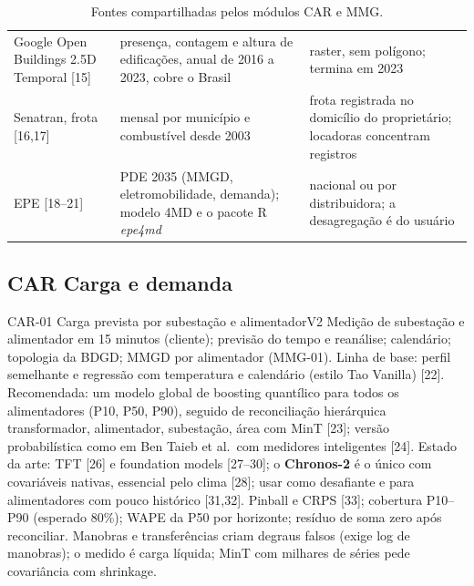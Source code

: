 \begin{table}[H]
\begin{tabularx}{\textwidth}{P{3.2cm} L P{4.2cm}}
Google Open Buildings 2.5D Temporal [15] & presença, contagem e altura de edificações, anual de 2016 a 2023, cobre o Brasil & raster, sem polígono; termina em 2023 \\
Senatran, frota [16,17] & mensal por município e combustível desde 2003 & frota registrada no domicílio do proprietário; locadoras concentram registros \\
EPE [18--21] & PDE 2035 (MMGD, eletromobilidade, demanda); modelo 4MD e o pacote R \emph{epe4md} & nacional ou por distribuidora; a desagregação é do usuário \\
\bottomrule
\end{tabularx}
\caption{Fontes compartilhadas pelos módulos CAR e MMG.}
\end{table}

\subsection{CAR \textperiodcentered{} Carga e demanda}

\begin{ficha}{CAR-01 \textperiodcentered{} Carga prevista por subestação e alimentador}{V2}
 Medição de subestação e alimentador em 15 minutos (cliente);
previsão do tempo e reanálise; calendário; topologia da BDGD; MMGD por
alimentador (MMG-01).
 Linha de base: perfil semelhante e regressão com
temperatura e calendário (estilo Tao Vanilla) [22]. Recomendada: um modelo
global de boosting quantílico para todos os alimentadores (P10, P50, P90),
seguido de reconciliação hierárquica transformador, alimentador,
subestação, área com MinT [23]; versão probabilística como em Ben Taieb et
al.\ com medidores inteligentes [24]. Estado da arte: TFT [26] e foundation
models [27--30]; o \textbf{Chronos-2} é o único com covariáveis nativas,
essencial pelo clima [28]; usar como desafiante e para alimentadores com
pouco histórico [31,32].
 Pinball e CRPS [33]; cobertura P10--P90 (esperado 80\%);
WAPE da P50 por horizonte; resíduo de soma zero após reconciliar.
 Manobras e transferências criam degraus falsos (exige
log de manobras); o medido é carga líquida; MinT com milhares de séries pede
covariância com shrinkage.
\end{ficha}

